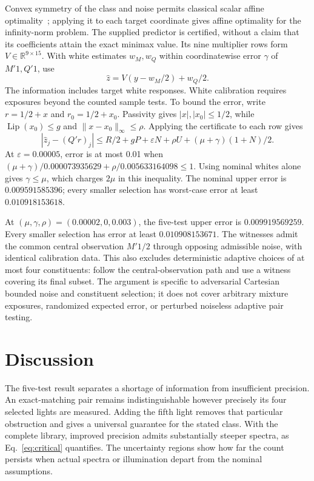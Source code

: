 \documentclass{optica-article}
\newcommand{\norm}[1]{\lVert#1\rVert}
\begin{document}
Convex symmetry of the class and noise permits classical scalar affine optimality~\cite{novak,ettehad}; applying it to each target coordinate gives affine optimality for the infinity-norm problem. The supplied predictor is certified, without a claim that its coefficients attain the exact minimax value. Its nine multiplier rows form $V\in\mathbb R^{9\times15}$. With white estimates $w_M,w_Q$ within coordinatewise error $\gamma$ of $M'1,Q'1$, use
\begin{equation}
 \widehat z=V(y-w_M/2)+w_Q/2.                            \label{eq:predictor}
\end{equation}
The information includes target white responses. White calibration requires exposures beyond the counted sample tests. To bound the error, write $r=1/2+x$ and $r_0=1/2+x_0$. Passivity gives $|x|,|x_0|\leq1/2$, while $\operatorname{Lip}(x_0)\leq g$ and $\norm{x-x_0}_\infty\leq\rho$. Applying the certificate to each row gives
\begin{equation}
 |\widehat z_j-(Q'r)_j|\leq R/2+gP+\varepsilon N+\rho U
                       +(\mu+\gamma)(1+N)/2.           \label{eq:prederror}
\end{equation}
At $\varepsilon=0.00005$, error is at most 0.01 when
$(\mu+\gamma)/0.000073935629+\rho/0.005633164098\leq1$.
Using nominal whites alone gives $\gamma\leq\mu$, which charges $2\mu$ in this inequality. The nominal upper error is $0.009591585396$; every smaller selection has worst-case error at least $0.010918153618$.

At $(\mu,\gamma,\rho)=(0.00002,0,0.003)$, the five-test upper error is $0.009919569259$. Every smaller selection has error at least $0.010908153671$. The witnesses admit the common central observation $M'1/2$ through opposing admissible noise, with identical calibration data. This also excludes deterministic adaptive choices of at most four constituents: follow the central-observation path and use a witness covering its final subset. The argument is specific to adversarial Cartesian bounded noise and constituent selection; it does not cover arbitrary mixture exposures, randomized expected error, or perturbed noiseless adaptive pair testing.

\section{Discussion}
The five-test result separates a shortage of information from insufficient precision. An exact-matching pair remains indistinguishable however precisely its four selected lights are measured. Adding the fifth light removes that particular obstruction and gives a universal guarantee for the stated class. With the complete library, improved precision admits substantially steeper spectra, as Eq.~\eqref{eq:critical} quantifies. The uncertainty regions show how far the count persists when actual spectra or illumination depart from the nominal assumptions.
\end{document}
